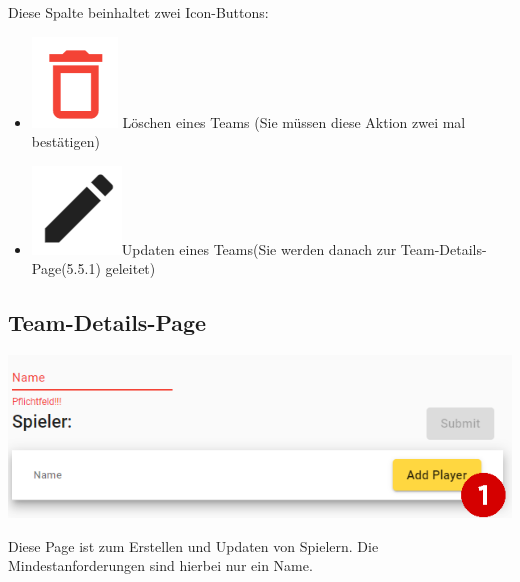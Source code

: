 Diese Spalte beinhaltet zwei Icon-Buttons:
\begin{itemize}
    \item \includegraphics[scale=0.3]{pics/user-guide/delete-icon.PNG} Löschen eines Teams (Sie müssen diese Aktion zwei mal bestätigen)
    \item \includegraphics[scale=0.3]{pics/user-guide/edit-icon.PNG}Updaten eines Teams(Sie werden danach zur Team-Details-Page(5.5.1) geleitet)
\end{itemize}

\bigskip
\subsection{Team-Details-Page}
\includegraphics[scale=0.5]{pics/user-guide/team-create-page.PNG}

Diese Page ist zum Erstellen und Updaten von Spielern. Die Mindestanforderungen sind hierbei nur ein Name.

